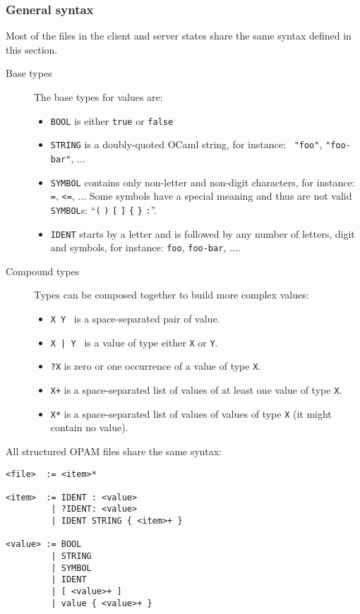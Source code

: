 \documentclass[a4paper,11pt]{article}
\begin{document}
\subsubsection{General syntax}
\label{syntax}

Most of the files in the client and server states share the same
syntax defined in this section.

\begin{description}

\item[Base types] The base types for values are:

\begin{itemize}
\item {\tt BOOL} is  either {\tt true} or {\tt false}
\item {\tt STRING} is a doubly-quoted OCaml string, for instance: {\tt
  "foo"}, {\tt "foo-bar"}, $\ldots$
\item {\tt SYMBOL} contains only non-letter and non-digit characters,
  for instance: {\tt =}, {\tt <=}, $\ldots$ Some symbols have a special
  meaning and thus are not valid {\tt SYMBOL}s: ``\verb+(+ \verb+)+
  \verb+[+ \verb+]+ \verb+{+ \verb+}+ \verb+:+''.
\item {\tt IDENT} starts by a letter and is followed by any number of
  letters, digit and symbols, for instance: {\tt foo}, {\tt foo-bar},
  $\ldots$. 
\end{itemize}


\item[Compound types] Types can be composed together to build more
  complex values:

\begin{itemize}
\item {\tt X Y } is a space-separated pair of value.
\item {\tt X | Y } is a value of type either {\tt X} or {\tt Y}.
\item {\tt ?X} is zero or one occurrence of a value of type {\tt X}.
\item {\tt X+} is a space-separated list of values of at least one value
  of type {\tt X}.
\item {\tt X*} is a space-separated list of values of values of type
  {\tt X} (it might contain no value).
\end{itemize}

\end{description}

All structured OPAM files share the same syntax:

{\small
\begin{Verbatim}[frame=single]
<file>  := <item>*

<item>  := IDENT : <value>
         | ?IDENT: <value>
         | IDENT STRING { <item>+ }

<value> := BOOL
         | STRING
         | SYMBOL
         | IDENT
         | [ <value>+ ]
         | value { <value>+ }
\end{Verbatim}
}
\end{document}
